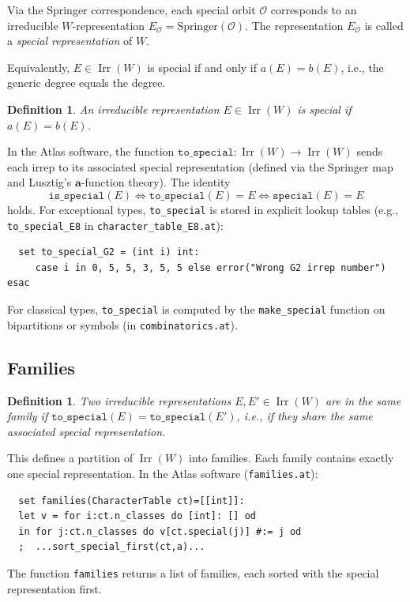 \documentclass[12pt]{amsart}
\newtheorem{definition}[theorem]{Definition}
\newcommand{\Irr}{\operatorname{Irr}}
\newcommand{\cO}{\mathcal{O}}
\begin{document}
Via the Springer correspondence, each special orbit $\cO$ corresponds to an
irreducible $W$-representation $E_\cO = \text{Springer}(\cO)$.  The
representation $E_\cO$ is called a \emph{special representation} of $W$.

Equivalently, $E \in \Irr(W)$ is special if and only if $a(E) = b(E)$, i.e.,
the generic degree equals the degree.

\begin{definition}
  An irreducible representation $E \in \Irr(W)$ is \emph{special} if
  $a(E) = b(E)$.
\end{definition}

In the Atlas software, the function $\texttt{to\_special}: \Irr(W) \to \Irr(W)$
sends each irrep to its associated special representation (defined via the
Springer map and Lusztig's $\mathbf{a}$-function theory).  The identity
\[
  \texttt{is\_special}(E) \iff \texttt{to\_special}(E) = E
  \iff \texttt{special}(E) = E
\]
holds.  For exceptional types, \texttt{to\_special} is stored in explicit
lookup tables (e.g., \texttt{to\_special\_E8} in
\texttt{character\_table\_E8.at}):
\begin{verbatim}
  set to_special_G2 = (int i) int:
     case i in 0, 5, 5, 3, 5, 5 else error("Wrong G2 irrep number") esac
\end{verbatim}
For classical types, \texttt{to\_special} is computed by the
\texttt{make\_special} function on bipartitions or symbols (in
\texttt{combinatorics.at}).

\subsection{Families}

\begin{definition}
  Two irreducible representations $E, E' \in \Irr(W)$ are in the same
  \emph{family} if $\texttt{to\_special}(E) = \texttt{to\_special}(E')$,
  i.e., if they share the same associated special representation.
\end{definition}

This defines a partition of $\Irr(W)$ into families.  Each family contains
exactly one special representation.  In the Atlas software
(\texttt{families.at}):
\begin{verbatim}
  set families(CharacterTable ct)=[[int]]:
  let v = for i:ct.n_classes do [int]: [] od
  in for j:ct.n_classes do v[ct.special(j)] #:= j od
  ;  ...sort_special_first(ct,a)...
\end{verbatim}
The function \texttt{families} returns a list of families, each sorted with the
special representation first.
\end{document}
